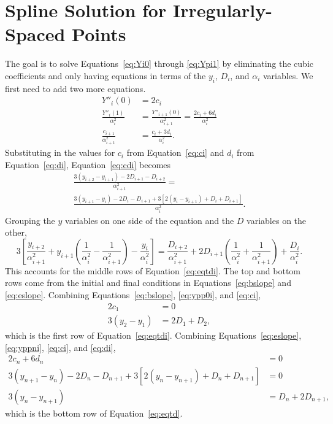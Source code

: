 \documentclass{scrartcl}
\begin{document}
\section{Spline Solution for Irregularly-Spaced Points}\label{sec:irreg-deriv}
The goal is to solve Equations~\ref{eq:Yi0} through \ref{eq:Ypi1}
by eliminating the cubic coefficients and only having equations
in terms of the $y_i$, $D_i$, and $\alpha_i$ variables.
We first need to add two more equations.
\begin{align}
Y''_i(0) &= 2c_i\label{eq:ypp0i}\\
\frac{Y''_i(1)}{\alpha_i^2} &= \frac{Y''_{i+1}(0)}{\alpha_{i+1}^2}
 = \frac{2c_i+6d_i}{\alpha_i^2}\label{eq:yppni}\\
\frac{c_{i+1}}{\alpha_{i+1}^2} &=
	\frac{c_i + 3d_i}{\alpha_i^2}. \label{eq:cdi}
\end{align}
Substituting in the values for $c_i$ from Equation~\ref{eq:ci} and
$d_i$ from Equation~\ref{eq:di}, Equation~\ref{eq:cdi} becomes
\begin{multline}
\frac{3(y_{i+2}-y_{i+1})-2D_{i+1}-D_{i+2}}{\alpha_{i+1}^2} = \\
	\frac{3(y_{i+1}-y_i)-2D_i-D_{i+1}
	+3[2(y_i-y_{i+1})+D_i+D_{i+1}]}{\alpha_i^2}.
\end{multline}
Grouping the $y$ variables on one side of the equation and the $D$
variables on the other,
\begin{equation}
3\left[\frac{y_{i+2}}{\alpha_{i+1}^2}+y_{i+1}\left(\frac{1}{\alpha_i^2}
	-\frac{1}{\alpha_{i+1}^2}\right)-\frac{y_i}{\alpha_i^2}\right]
	= \frac{D_{i+2}}{\alpha_{i+1}^2}
		+2D_{i+1}\left(\frac{1}{\alpha_i^2}+\frac{1}{\alpha_{i+1}^2}\right)
		+\frac{D_i}{\alpha_i^2}.
\end{equation}
This accounts for the middle rows of Equation~\ref{eq:eqtdi}. The
top and bottom rows come from the initial and final conditions
in Equations~\ref{eq:bslope} and \ref{eq:eslope}. Combining
Equations~\ref{eq:bslope}, \ref{eq:ypp0i}, and \ref{eq:ci},
\begin{align}
2c_1 & = 0\\
3(y_2-y_1) &= 2D_1 + D_2,
\end{align}
which is the first row of Equation~\ref{eq:eqtdi}. Combining
Equations~\ref{eq:eslope}, \ref{eq:yppni}, \ref{eq:ci}, and
\ref{eq:di},
\begin{align}
2c_n+6d_n &= 0\\
3(y_{n+1}-y_n)-2D_n-D_{n+1}+3[2(y_n-y_{n+1})+D_n+D_{n+1}] &= 0\\
3(y_n-y_{n+1}) &= D_n+2D_{n+1},
\end{align}
which is the bottom row of Equation~\ref{eq:eqtd}.
\end{document}
